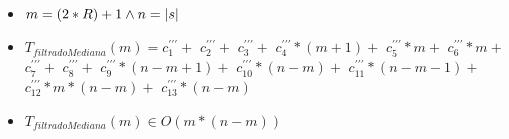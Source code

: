 \documentclass{article}
\begin{document}
    \begin{itemize}
        \item $m = (2*R) + 1 \wedge n = |s|$
        \item $T_{filtradoMediana}(m) = c^{\prime\prime\prime}_1+           $
                                       $c^{\prime\prime\prime}_2+           $
                                       $c^{\prime\prime\prime}_3+           $
                                       $c^{\prime\prime\prime}_4*(m+1)+     $
                                       $c^{\prime\prime\prime}_5*m+         $
                                       $c^{\prime\prime\prime}_6*m+         $
                                       $c^{\prime\prime\prime}_7+           $
                                       $c^{\prime\prime\prime}_8+           $
                                       $c^{\prime\prime\prime}_9*(n-m+1)+   $
                                       $c^{\prime\prime\prime}_{10}*(n-m)+  $
                                       $c^{\prime\prime\prime}_{11}*(n-m-1)+$
                                       $c^{\prime\prime\prime}_{12}*m*(n-m)+$
                                       $c^{\prime\prime\prime}_{13}*(n-m)   $
        \item $T_{filtradoMediana}(m) \in O(m*(n-m))$
    \end{itemize}
\end{document}
